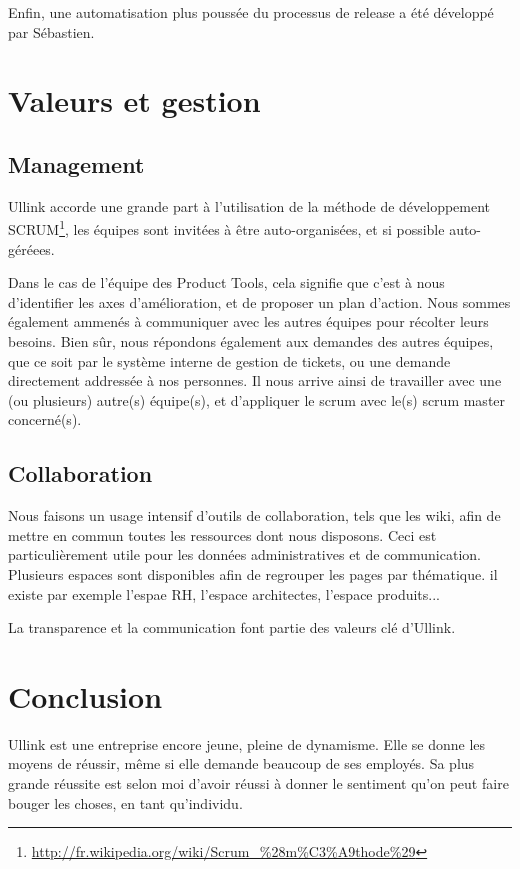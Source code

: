 \documentclass[a4paper, 12pt]{article}
\begin{document}
Enfin, une automatisation plus poussée du processus de release a été développé par Sébastien.

\section{Valeurs et gestion}

\subsection{Management}

Ullink accorde une grande part à l'utilisation de la méthode de développement SCRUM\footnote{\url{http://fr.wikipedia.org/wiki/Scrum_\%28m\%C3\%A9thode\%29}}, les équipes sont invitées à être auto-organisées, et si possible auto-géréees.

Dans le cas de l'équipe des Product Tools, cela signifie que c'est à nous d'identifier les axes d'amélioration, et de proposer un plan d'action. Nous sommes également ammenés à communiquer avec les autres équipes pour récolter leurs besoins. Bien sûr, nous répondons également aux demandes des autres équipes, que ce soit par le système interne de gestion de tickets, ou une demande directement addressée à nos personnes. Il nous arrive ainsi de travailler avec une (ou plusieurs) autre(s) équipe(s), et d'appliquer le scrum avec le(s) scrum master concerné(s).

\subsection{Collaboration}

Nous faisons un usage intensif d'outils de collaboration, tels que les wiki, afin de mettre en commun toutes les ressources dont nous disposons. Ceci est particulièrement utile pour les données administratives et de communication. Plusieurs espaces sont disponibles afin de regrouper les pages par thématique. il existe par exemple l'espae RH, l'espace architectes, l'espace produits...

La transparence et la communication font partie des valeurs clé d'Ullink.

\pagebreak
\section*{Conclusion}

Ullink est une entreprise encore jeune, pleine de dynamisme. Elle se donne les moyens de réussir, même si elle demande beaucoup de ses employés. Sa plus grande réussite est selon moi d'avoir réussi à donner le sentiment qu'on peut faire bouger les choses, en tant qu'individu.
\end{document}
